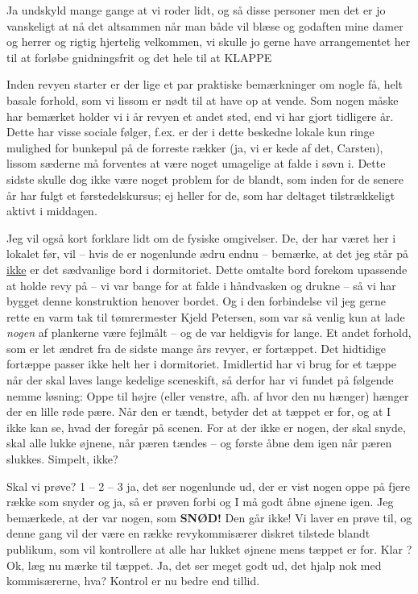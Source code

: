 \documentclass[a4paper,11pt]{article}
\begin{document}
\begin{sketch}
 Ja undskyld mange gange at vi roder lidt, og så disse personer men det
er jo vanskeligt at nå det altsammen når man både vil blæse og godaften mine
damer og herrer og rigtig hjertelig velkommen, vi skulle jo gerne have
arrangementet her til at forløbe gnidningsfrit og det hele til at KLAPPE


 Inden revyen starter er der lige et par praktiske bemærkninger om
nogle få, helt basale forhold, som vi lissom er nødt til at have op at
vende. Som nogen måske har bemærket holder vi i år revyen et andet sted, end vi
har gjort tidligere år. Dette har visse sociale følger, f.ex. er der i dette
beskedne lokale kun ringe mulighed for bunkepul på de forreste rækker (ja, vi er
kede af det, Carsten), lissom sæderne må forventes at være noget umagelige at
falde i søvn i. Dette sidste skulle dog ikke være noget problem for de blandt,
som inden for de senere år har fulgt et førstedelskursus; ej heller for de, som
har deltaget tilstrækkeligt aktivt i middagen.

Jeg vil også kort forklare lidt om de fysiske omgivelser. De, der har været her
i lokalet før, vil -- hvis de er nogenlunde ædru endnu -- bemærke, at det jeg
står på \underline{ikke} er det sædvanlige bord i dormitoriet. Dette omtalte
bord forekom upassende at holde revy på -- vi var bange for at falde i
håndvasken og drukne -- så vi har bygget denne konstruktion henover bordet. Og i
den forbindelse vil jeg gerne rette en varm tak til tømrermester Kjeld Petersen,
som var så venlig kun at lade \emph{nogen} af plankerne være fejlmålt -- og de
var heldigvis for lange. Et andet forhold, som er let ændret fra de sidste mange
års revyer, er fortæppet. Det hidtidige fortæppe passer ikke helt her i
dormitoriet. Imidlertid har vi brug for et tæppe når der skal laves lange
kedelige sceneskift, så derfor har vi fundet på følgende nemme løsning: Oppe til
højre (eller venstre, afh. af hvor den nu hænger) hænger der en lille røde
pære. Når den er tændt, betyder det at tæppet er for, og at I ikke kan se, hvad
der foregår på scenen. For at der ikke er nogen, der skal snyde, skal alle lukke
øjnene, når pæren tændes -- og første åbne dem igen når pæren slukkes. Simpelt,
ikke?

Skal vi prøve? 1 -- 2 -- 3  ja, det ser nogenlunde ud, der er
vist nogen oppe på fjere række som snyder og ja, så er prøven forbi  og I må godt åbne øjnene igen. Jeg bemærkede, at der var nogen, som
\textbf{SNØD!} Den går ikke! Vi laver en prøve til, og denne gang vil der være
en række revykommisærer diskret tilstede blandt publikum, som vil kontrollere at
alle har lukket øjnene mens tæppet er for. Klar ? Ok, læg nu mærke til tæppet.
 Ja, det ser meget godt ud, det
hjalp nok med kommisærerne, hva? Kontrol er nu bedre end tillid.


\end{sketch}
\end{document}
